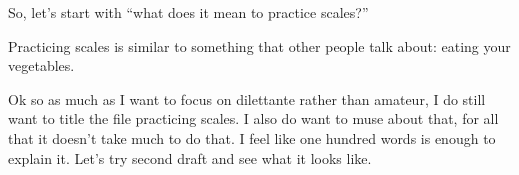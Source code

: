 \documentclass[12pt]{article}[titlepage]
\newcommand{\say}[1]{``#1''}
\newcommand{\1}{\={a}}
\newcommand{\2}{\={e}}
\newcommand{\3}{\={\i}}
\newcommand{\4}{\=o}
\newcommand{\5}{\=u}
\newcommand{\6}{\={A}}
\renewcommand{\,}{\textsuperscript{,}}
\begin{document}
So, let's start with \say{what does it mean to practice scales?}

Practicing scales is similar to something that other people talk about: eating your vegetables.

Ok so as much as I want to focus on dilettante rather than amateur, I do still want to title the file practicing scales.
I also do want to muse about that, for all that it doesn't take much to do that.
I feel like one hundred words is enough to explain it.
Let's try second draft and see what it looks like.
\end{document}
